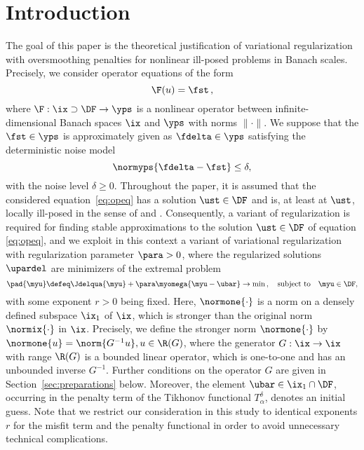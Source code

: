 \documentclass[10pt]{article}
\theoremstyle{definition}
\begin{document}
\section{Introduction}
\label{intro}
%
The goal of this paper is the theoretical justification of variational regularization with oversmoothing penalties for nonlinear ill-posed problems in Banach scales. Precisely, we consider operator equations of the form
\begin{equation} \label{eq:opeq}
\F(u) = \fst \,,
\end{equation}
%
where $ \F: \ix \supset \DF \to \yps $ is a nonlinear operator
between infinite-dimensional Banach spaces $ \ix $ and $ \yps $ with norms $\|\cdot\|$.
We suppose that the \rhs $ \fst \in \yps $ is approximately given as $ \fdelta \in \yps$ satisfying the deterministic noise model
%
\begin{equation} \label{eq:noise}
\normyps{ \fdelta-\fst } \le \delta,
\end{equation}
with the noise level $\delta \ge 0$.
Throughout the paper, it is assumed that the considered equation~\eqref{eq:opeq} has a solution $ \ust \in \DF $ and is, at least at $ \ust$, locally ill-posed in the sense of \cite[Def.~1.1]{HofSch98} and \cite[Def.~3]{HofPla18}.
Consequently, a variant of regularization is required for finding stable approximations to the solution  $ \ust \in \DF $ of equation \eqref{eq:opeq}, and we exploit in this context a variant of variational regularization with regularization parameter $\para>0$, where the regularized solutions $\upardel$ are minimizers of the extremal problem
%
\begin{equation} \label{eq:TR}
\pad{\myu} \defeq \Jdelqua{\myu} + \para \myomega{\myu-\ubar} \to \min\,, \quad \textup{subject to} \quad  \myu \in \DF,
\end{equation}
%
with some exponent $ r > 0 $ being fixed. Here, $ \normone{\cdot} $ is a norm on a densely defined subspace $\ix_1$ of $\ix$, which is stronger than the original norm $ \normix{\cdot} $ in $ \ix $.
Precisely, we define the stronger norm $\normone{\cdot}$ by
$ \normone{u} = \norm{G^{-1}u}, u \in \R(G) $, where the generator
$ G: \ix \to \ix $ with range $\R(G)$ is a bounded linear operator, which is one-to-one and has an unbounded inverse $ G^{-1} $. Further conditions on the operator $ G $ are given in Section~\ref{sec:preparations} below.
Moreover, the element $\ubar \in \ix_1 \cap\DF$, occurring in the penalty term of the Tikhonov functional $T_\alpha^\delta$, denotes an initial guess.
Note that we restrict our consideration in this study to identical exponents $r$ for the misfit term and the penalty functional in order to avoid unnecessary technical complications.
\end{document}
